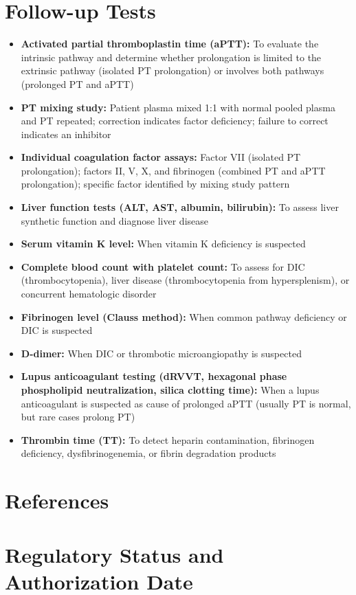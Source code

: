 \section*{Follow-up Tests}
\begin{itemize}
  \item \textbf{Activated partial thromboplastin time (aPTT):} To evaluate the intrinsic pathway and determine whether prolongation is limited to the extrinsic pathway (isolated PT prolongation) or involves both pathways (prolonged PT and aPTT)
  \item \textbf{PT mixing study:} Patient plasma mixed 1:1 with normal pooled plasma and PT repeated; correction indicates factor deficiency; failure to correct indicates an inhibitor
  \item \textbf{Individual coagulation factor assays:} Factor VII (isolated PT prolongation); factors II, V, X, and fibrinogen (combined PT and aPTT prolongation); specific factor identified by mixing study pattern
  \item \textbf{Liver function tests (ALT, AST, albumin, bilirubin):} To assess liver synthetic function and diagnose liver disease
  \item \textbf{Serum vitamin K level:} When vitamin K deficiency is suspected
  \item \textbf{Complete blood count with platelet count:} To assess for DIC (thrombocytopenia), liver disease (thrombocytopenia from hypersplenism), or concurrent hematologic disorder
  \item \textbf{Fibrinogen level (Clauss method):} When common pathway deficiency or DIC is suspected
  \item \textbf{D-dimer:} When DIC or thrombotic microangiopathy is suspected
  \item \textbf{Lupus anticoagulant testing (dRVVT, hexagonal phase phospholipid neutralization, silica clotting time):} When a lupus anticoagulant is suspected as cause of prolonged aPTT (usually PT is normal, but rare cases prolong PT)
  \item \textbf{Thrombin time (TT):} To detect heparin contamination, fibrinogen deficiency, dysfibrinogenemia, or fibrin degradation products
\end{itemize}

\section*{References}



\clearpage
\section*{Regulatory Status and Authorization Date}

\clearpage
